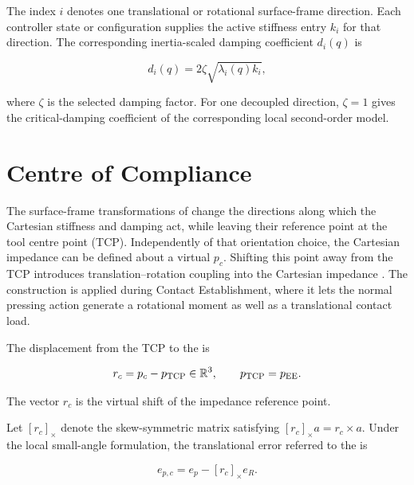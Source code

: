 The index \mbox{\(i\)} denotes one translational or rotational surface-frame
direction. Each controller state or configuration supplies the active
stiffness entry \mbox{\(k_i\)} for that direction. The corresponding
inertia-scaled damping coefficient \mbox{\(d_i(q)\)} is

\begin{equation}
d_i(q)
=
2\zeta\sqrt{\lambda_i(q)k_i},
\label{eq:inertia_scaled_damping}
\end{equation}

where \mbox{\(\zeta\)} is the selected damping factor. For one decoupled
direction, \mbox{\(\zeta=1\)} gives the critical-damping coefficient of the
corresponding local second-order model.

\section{Centre of Compliance}
\label{sec:centre_of_compliance}

The surface-frame transformations of
\mbox{}
change the directions along
which the Cartesian stiffness and damping act, while leaving their reference
point at the tool centre point (TCP). Independently of that orientation choice,
the Cartesian impedance can be defined about a virtual 
\mbox{\(p_c\)}. Shifting this point away from the TCP introduces
translation--rotation coupling into the Cartesian impedance
\mbox{\cite{Murray1994,Fasse1997SpatialImpedance,Stramigioli2000IPC,LynchPark2017}}.
The construction is applied during Contact Establishment, where it lets the normal
pressing action generate a rotational moment as well as a translational contact
load.

The displacement from the TCP to the  is

\begin{equation}
r_c
=
p_c-p_{\mathrm{TCP}}
\in\mathbb{R}^{3},
\qquad
p_{\mathrm{TCP}}=p_{\mathrm{EE}}.
\label{eq:pole_to_tcp_lever}
\end{equation}

The vector \mbox{\(r_c\)} is the virtual shift of the impedance reference
point.

Let \mbox{\([r_c]_\times\)} denote the skew-symmetric matrix satisfying
\mbox{\([r_c]_\times a=r_c\times a\)}. Under the local small-angle
formulation, the translational error referred to the  is

\begin{equation}
e_{p,c}
=
e_p-[r_c]_\times e_R.
\label{eq:pole_small_motion_error}
\end{equation}

